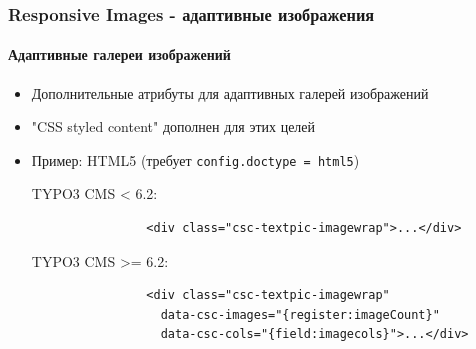 \begin{frame}[fragile]
	\frametitle{Responsive Images - адаптивные изображения}
	\framesubtitle{Адаптивные галереи изображений}

	\begin{itemize}
		\item Дополнительные атрибуты для адаптивных галерей изображений
		\item "CSS styled content" дополнен для этих целей
		\item Пример: HTML5 (требует \texttt{config.doctype = html5})\newline

			TYPO3 CMS < 6.2:


			\begin{lstlisting}
				<div class="csc-textpic-imagewrap">...</div>
			\end{lstlisting}

			TYPO3 CMS >= 6.2:

			\begin{lstlisting}
				<div class="csc-textpic-imagewrap"
				  data-csc-images="{register:imageCount}"
				  data-csc-cols="{field:imagecols}">...</div>
			\end{lstlisting}

	\end{itemize}

\end{frame}


